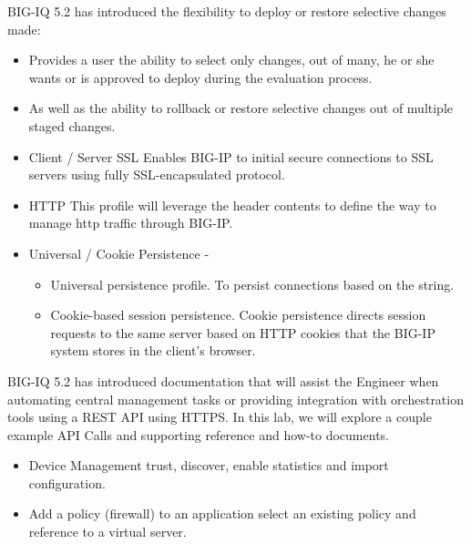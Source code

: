 \documentclass[letterpaper,10pt,english]{sphinxmanual}
\begin{document}
BIG-IQ 5.2 has introduced the flexibility to deploy or restore selective
changes made:
\begin{itemize}
\item {} 
Provides a user the ability to select only changes, out of many, he
or she wants or is approved to deploy during the evaluation process.

\item {} 
As well as the ability to rollback or restore selective changes out
of multiple staged changes.

\end{itemize}

\begin{itemize}
\item {} 
Client / Server SSL \textendash{} Enables BIG-IP to initial secure connections to
SSL servers using fully SSL-encapsulated protocol.

\item {} 
HTTP \textendash{} This profile will leverage the header contents to define the
way to manage http traffic through BIG-IP.

\item {} 
Universal / Cookie Persistence -
\begin{itemize}
\item {} 
Universal persistence profile. To persist connections based on the
string.

\item {} 
Cookie-based session persistence. Cookie persistence directs
session requests to the same server based on HTTP cookies that the
BIG-IP system stores in the client’s browser.

\end{itemize}

\end{itemize}


BIG-IQ 5.2 has introduced documentation that will assist the Engineer
when automating central management tasks or providing integration with
orchestration tools using a REST API using HTTPS. In this lab, we will
explore a couple example API Calls and supporting reference and how-to
documents.
\begin{itemize}
\item {} 
Device Management \textendash{} trust, discover, enable statistics and import
configuration.

\item {} 
Add a policy (firewall) to an application \textendash{} select an existing policy
and reference to a virtual server.

\end{itemize}
\end{document}
